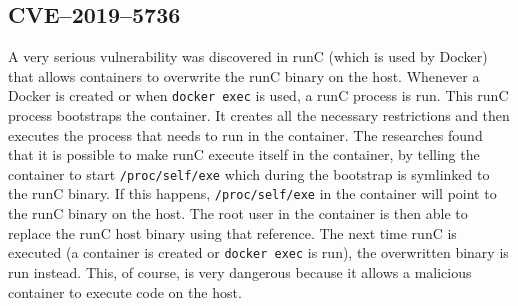 \subsection{CVE--2019--5736}
A very serious vulnerability was discovered in runC (which is used by Docker) that allows containers to overwrite the runC binary on the host\cite{CVE-2019-5736-DragonSector}\cite{CVE-2019-5736-Github}\cite{CVE-2019-5736-Twistlock}. Whenever a Docker is created or when \lstinline{docker exec} is used, a runC process is run. This runC process bootstraps the container. It creates all the necessary restrictions and then executes the process that needs to run in the container. The researches found that it is possible to make runC execute itself in the container, by telling the container to start \lstinline{/proc/self/exe} which during the bootstrap is symlinked to the runC binary. If this happens, \lstinline{/proc/self/exe} in the container will point to the runC binary on the host. The root user in the container is then able to replace the runC host binary using that reference. The next time runC is executed (a container is created or \lstinline{docker exec} is run), the overwritten binary is run instead.
This, of course, is very dangerous because it allows a malicious container to execute code on the host.
